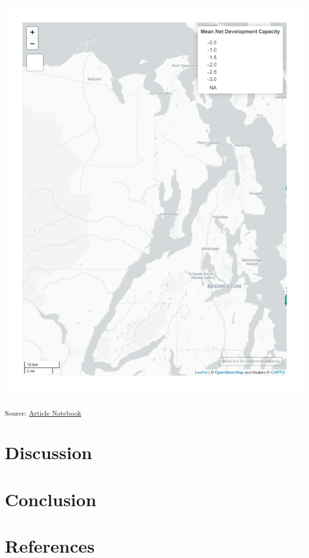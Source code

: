 \documentclass[
]{agujournal2019}
\begin{document}
\includegraphics{index_files/figure-pdf/results-puget-sound-station-map-1.pdf}

\textsubscript{Source:
\href{https://tiernanmartin.github.io/2024-transit-oriented-development-bill/index.qmd.html}{Article
Notebook}}

\section{Discussion}\label{discussion}

\section{Conclusion}\label{conclusion}

\section*{References}\label{references}
\end{document}
